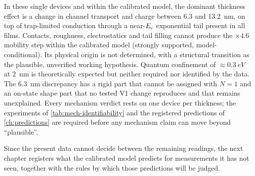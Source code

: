 \begin{keyresult}[title={Chapter summary}]
In these single devices and within the calibrated model, the dominant thickness effect is a change in channel transport and charge between 6.3 and \SI{13.2}{nm}, on top of trap-limited conduction through a near-$E_{\mathrm{c}}$ exponential tail present in all films. Contacts, roughness, electrostatics and tail filling cannot produce the $\times4.6$ mobility step within the calibrated model (strongly supported, model-conditional). Its physical origin is not determined, with a structural transition as the plausible, unverified working hypothesis. Quantum confinement of $\approx\SI{0.3}{eV}$ at \SI{2}{nm} is theoretically expected but neither required nor identified by the data. The \SI{6.3}{nm} discrepancy has a rigid part that cannot be assigned with $N = 1$ and an on-state shape part that no tested V1 change reproduces and that remains unexplained. Every mechanism verdict rests on one device per thickness; the experiments of \cref{tab:mech-identifiability} and the registered predictions of \cref{ch:predictions} are required before any mechanism claim can move beyond ``plausible''.
\end{keyresult}

Since the present data cannot decide between the remaining readings, the next chapter registers what the calibrated model predicts for measurements it has not seen, together with the rules by which those predictions will be judged.
